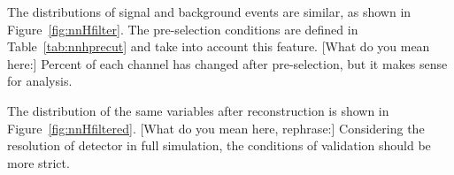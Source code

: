 \documentclass[11pt,a4paper]{cepcnote}
\begin{document}
The distributions of signal and background events are similar, as shown in
Figure~\ref{fig:nnHfilter}. The pre-selection conditions are defined in
Table~\ref{tab:nnhprecut} and take into account this feature.
{\color{red} [What do you mean here:] Percent of each channel has changed after pre-selection, but it makes sense for analysis}.

The distribution of the same variables after reconstruction is shown in
Figure~\ref{fig:nnHfiltered}.
{\color{red} [What do you mean here, rephrase:] Considering the resolution of detector in full simulation, the conditions of validation should be more strict.}

\end{document}
